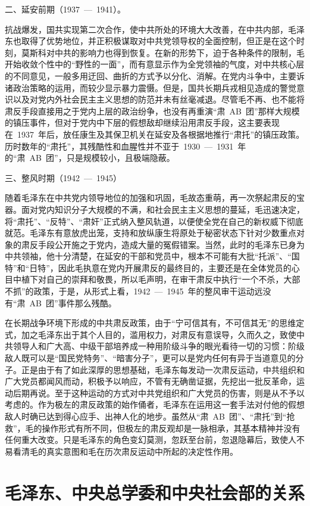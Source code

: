 二、延安前期（1937~—~1941）。

抗战爆发，国共实现第二次合作，使中共所处的环境大大改善，在中共内部，毛泽东也取得了优势地位，并正积极谋取对中共党领导权的全面控制，但正是在这个时刻，莫斯科对中共的影响力也得到恢复。在新的形势下，迫于各种条件的限制，毛开始收敛个性中的“野性的一面”，而有意显示作为全党领袖的气度，对中共核心层的不同意见，一般多用迂回、曲折的方式予以分化、消解。在党内斗争中，主要诉诸政治策略的运用，而较少显示暴力震慑。但是，国共长期兵戎相见造成的警觉意识以及对党内外社会民主主义思想的防范并未有丝毫减退。尽管毛不再、也不能将肃反手段直接用之于党内上层的政治纷争，也没有再重演“肃~AB~团”那样大规模的镇压事件，但对于党内中下层的假想敌却继续沿用肃反手段，这主要表现在~1937~年后，放任康生及其保卫机关在延安及各根据地推行“肃托”的镇压政策。历时数年的“肃托”，其残酷性和血腥性并不亚于~1930~—~1931~年的“肃~AB~团”，只是规模较小，且极端隐蔽。

三、整风时期（1942~—~1945）

随着毛泽东在中共党内领导地位的加强和巩固，毛故态重萌，再一次祭起肃反的宝器。面对党内知识分子大规模的不满，和社会民主主义思想的蔓延，毛迅速决定，将“肃托”、“反特”、“肃奸”正式纳入整风轨道，以便使全党在自己的新权威下彻底就范。毛泽东有意放虎出笼，支持和放纵康生将原处于秘密状态下针对少数重点对象的肃反手段公开施之于党内，造成大量的冤假错案。当然，此时的毛泽东已身为中共领袖，他十分清楚，在延安的干部和党员中，根本不可能有大批“托派”、“国特”和“日特”，因此毛执意在党内开展肃反的最终目的，主要还是在全体党员的心目中植下对自己的崇拜和敬畏，所以毛声明，在审干肃反中执行“一个不杀，大部不抓”的政策，于是，从形式上看，1942~—~1945~年的整风审干运动远没有“肃~AB~团”事件那么残酷。

在长期战争环境下形成的中共肃反政策，由于“宁可信其有，不可信其无”的思维定式，加之毛泽东出于其个人目的，滥用权力，对肃反有意误导，久而久之，致使中共领导人和广大高、中级干部培养成一种用阶级斗争的眼光看待一切的习惯：阶级敌人既可以是“国民党特务”、“暗害分子”，更可以是党内任何有异于当道意见的分子。正是由于有了如此深厚的思想基础，毛泽东每发动一次肃反运动，中共组织和广大党员都闻风而动，积极予以响应，不管有无确凿证据，先挖出一批反革命，运动后期再说。至于这种运动的方式对中共党组织和广大党员的伤害，则是从不予以考虑的。作为极左的肃反政策的始作俑者，毛泽东在运用这一套手法对付他的假想敌人时确已达到得心应手、出神人化的地步。虽然从“肃~AB~团”、“肃托”到“抢救”，毛的操作形式有所不同，但极左的肃反观却是一脉相承，其基本精神并没有任何重大改变。只是毛泽东的角色变幻莫测，忽跃至台前，忽退隐幕后，致使人不易看清毛的真实意图和毛在历次肃反运动中所起的决定性作用。

\section{毛泽东、中央总学委和中央社会部的关系}

